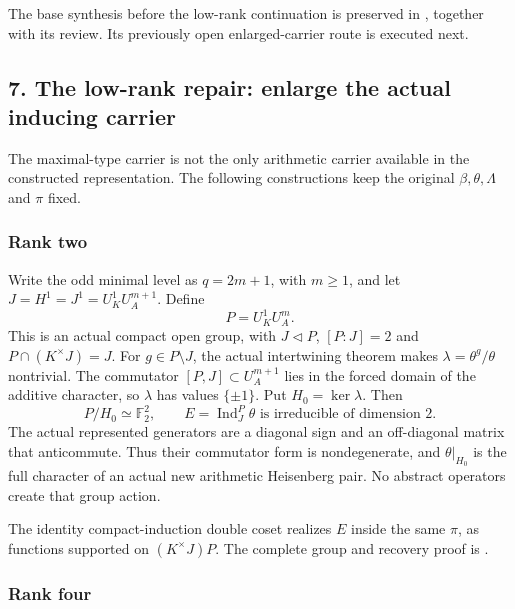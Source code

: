 The base synthesis before the low-rank continuation is preserved in
, together with its
review. Its previously open enlarged-carrier route is executed next.

\hypertarget{dyadic_synthesis-the-low-rank-repair-enlarge-the-actual-inducing-carrier}{%
\subsection{7. The low-rank repair: enlarge the actual inducing
carrier}\label{dyadic_synthesis-the-low-rank-repair-enlarge-the-actual-inducing-carrier}}

The maximal-type carrier is not the only arithmetic carrier available in
the constructed representation. The following constructions keep the
original \(\beta,\theta,\Lambda\) and \(\pi\) fixed.

\hypertarget{dyadic_synthesis-rank-two}{%
\subsubsection{Rank two}\label{dyadic_synthesis-rank-two}}

Write the odd minimal level as \(q=2m+1\), with \(m\ge1\), and let
\(J=H^1=J^1=U_K^1U_A^{m+1}\). Define \[
P=U_K^1U_A^m.
\] This is an actual compact open group, with \(J\triangleleft P\),
\([P:J]=2\) and \(P\cap(K^\times J)=J\). For \(g\in P\setminus J\), the
actual intertwining theorem makes \(\lambda=\theta^g/\theta\)
nontrivial. The commutator \([P,J]\subset U_A^{m+1}\) lies in the forced domain of the additive character, so \(\lambda\) has values \(\{\pm1\}\). Put
\(H_0=\ker\lambda\). Then \[
P/H_0\simeq\mathbb F_2^2,\qquad
E=\operatorname{Ind}_J^P\theta\text{ is irreducible of dimension }2.
\] The actual represented generators are a diagonal sign and an
off-diagonal matrix that anticommute. Thus their commutator form is
nondegenerate, and \(\theta|_{H_0}\) is the full character of an actual
new arithmetic Heisenberg pair. No abstract operators create that group
action.

The identity compact-induction double coset realizes \(E\) inside the
same \(\pi\), as functions supported on \((K^\times J)P\). The complete
group and recovery proof is
.

\hypertarget{dyadic_synthesis-rank-four}{%
\subsubsection{Rank four}\label{dyadic_synthesis-rank-four}}

